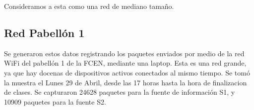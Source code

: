 Consideramos a esta como una red de mediano tamaño.

\subsection{Red Pabellón 1}
Se generaron estos datos registrando los paquetes enviados por medio de 
la red WiFi del pabellón 1 de la FCEN, mediante una laptop. Esta es una 
red grande, ya que hay docenas de dispositivos activos conectados al mismo
tiempo. Se tomó la muestra el Lunes 29 de Abril, desde las 17 horas hasta la hora de finalizacion de clases.
Se capturaron 24628 paquetes para la fuente de información S1, y 10909
paquetes para la fuente S2.
